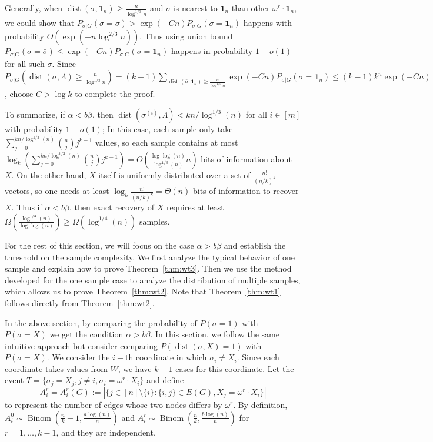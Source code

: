 \label{key}\documentclass[conference]{IEEEtran}
\DeclareMathOperator{\dist}{dist}
\DeclareMathOperator{\Binom}{Binom}
\begin{document}
Generally, when $\dist(\bar{\sigma}, \mathbf{1}_n) \geq \frac{n}{\log^{1/3} n}$ and $\bar{\sigma}$
is nearest to $\mathbf{1}_{n}$ than other $\omega^r \cdot \mathbf{1}_n$, we could show that
$P_{\sigma | G}(\sigma = \bar{\sigma} ) > \exp(-Cn) P_{\sigma | G}(\sigma = \mathbf{1}_n)$
happens with probability $O(\exp(-n \log^{2/3} n ))$. Thus using union bound 
$P_{\sigma | G}(\sigma = \bar{\sigma} ) \leq \exp(-Cn) P_{\sigma | G}(\sigma = \mathbf{1}_n)$
happens in probability $1-o(1)$ for all such $\bar{\sigma}$.
Since $P_{\sigma | G}(\dist(\bar{\sigma}, \Lambda)\geq \frac{n}{\log^{1/3} n})=(k-1)\sum_{\dist(\bar{\sigma}, \mathbf{1}_n) \geq \frac{n}{\log^{1/3} n}}\exp(-Cn) P_{\sigma | G}(\sigma = \mathbf{1}_n)\leq (k-1)k^n \exp(-Cn)$, choose $C> \log k$ to complete the proof.

To summarize, if $\alpha<b\beta$, then $\dist(\sigma^{(i)}, \Lambda)< kn/\log^{1/3}(n)$ for all $i\in[m]$ with probability $1-o(1)$;
In this case, each sample only take $\sum_{j=0}^{kn/\log^{1/3}(n)}\binom{n}{j}j^{k-1}$ values, so each sample contains at most $\log_k(\sum_{j=0}^{kn/\log^{1/3}(n)}\binom{n}{j}j^{k-1})=O(\frac{\log\log(n)}{\log^{1/3}(n)} n)$ bits of information about $X$. On the other hand, $X$ itself is uniformly distributed over a set of $\frac{n!}{(n/k)^k}$ vectors, so one needs at least $\log_k\frac{n!}{(n/k)^k}=\Theta(n)$ bits of information to recover $X$. Thus if $\alpha<b\beta$, then exact recovery of $X$ requires at least $\Omega(\frac{\log^{1/3}(n)}{\log\log(n)})\ge \Omega(\log^{1/4}(n))$ samples.

For the rest of this section, we will focus on the case $\alpha>b\beta$ and establish the threshold on the sample complexity. We first analyze the typical behavior of one sample and explain how to prove Theorem~\ref{thm:wt3}. Then we use the method developed for the one sample case to analyze the distribution of multiple samples, which allows us to prove Theorem~\ref{thm:wt2}. Note that Theorem~\ref{thm:wt1} follows directly from Theorem~\ref{thm:wt2}.


In the above section, by comparing the probability of $P(\sigma = 1)$ with $P(\sigma=X)$ we get the condition $\alpha > b \beta$.
In this section, we follow the same intuitive approach but consider comparing $P(\dist(\sigma, X) = 1)$ with $P(\sigma = X)$.
We consider the $i-$th coordinate in which $\sigma_i \neq X_i$. Since each coordinate takes values from $W$, we have $k-1$ cases for this coordinate.
Let the event $T=\{\sigma_j = X_j, j\neq i, \sigma_i = \omega^r \cdot X_i\}$ and define
\begin{equation*}
A^r_i=A^r_i(G):=|\{j\in[n]\setminus\{i\}:\{i,j\}\in E(G), X_j=\omega^r \cdot X_i\} |
\end{equation*}
to represent the number of edges whose two nodes differs by $\omega^r$.
By definition,
$A^0_i\sim \Binom(\frac{n}{k}-1,\frac{a\log(n)}{n})$ and $A^r_i\sim \Binom(\frac{n}{k}, \frac{b\log(n)}{n})$ for $r=1,\dots, k-1$, and they are independent.
\end{document}

